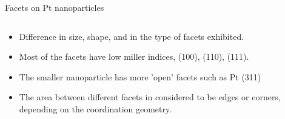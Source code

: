 \begin{frame}{Facets on Pt nanoparticles}
\begin{columns}
    \end{columns}

    \pause
    \centering
    \vspace{-1em}
    \begin{itemize}
        \item \textcolor{Important}{Difference in size, shape, and in the type of facets exhibited.}
        \pause
        \item Most of the facets have low miller indices, (100), (110), (111).
        \pause
        \item The smaller nanoparticle has more 'open' facets such as Pt (311)
        \pause
        \item The area between different facets in considered to be edges or corners, depending on the coordination geometry.
    \end{itemize}
    
\end{frame}